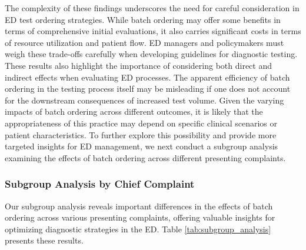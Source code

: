 \documentclass[,,nonblindrev]{informs}
\begin{document}
The complexity of these findings underscores the need for careful
consideration in ED test ordering strategies. While batch ordering may
offer some benefits in terms of comprehensive initial evaluations, it
also carries significant costs in terms of resource utilization and
patient flow. ED managers and policymakers must weigh these trade-offs
carefully when developing guidelines for diagnostic testing. These
results also highlight the importance of considering both direct and
indirect effects when evaluating ED processes. The apparent efficiency
of batch ordering in the testing process itself may be misleading if one
does not account for the downstream consequences of increased test
volume. Given the varying impacts of batch ordering across different
outcomes, it is likely that the appropriateness of this practice may
depend on specific clinical scenarios or patient characteristics. To
further explore this possibility and provide more targeted insights for
ED management, we next conduct a subgroup analysis examining the effects
of batch ordering across different presenting complaints.

\hypertarget{subgroup-analysis-by-chief-complaint}{%
\subsubsection{Subgroup Analysis by Chief
Complaint}\label{subgroup-analysis-by-chief-complaint}}

Our subgroup analysis reveals important differences in the effects of
batch ordering across various presenting complaints, offering valuable
insights for optimizing diagnostic strategies in the ED. Table
\ref{tab:subgroup_analysis} presents these results.
\end{document}
